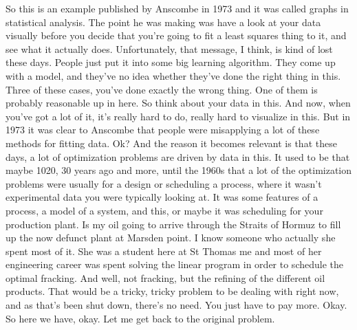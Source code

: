 \documentclass[11pt,a4paper]{article}
\begin{document}
So this is an example published by Anscombe in 1973 and it was called graphs in statistical analysis. The point he was making was have a look at your data visually before you decide that you're going to fit a least squares thing to it, and see what it actually does. Unfortunately, that message, I think, is kind of lost these days. People just put it into some big learning algorithm. They come up with a model, and they've no idea whether they've done the right thing in this. Three of these cases, you've done exactly the wrong thing. One of them is probably reasonable up in here. So think about your data in this. And now, when you've got a lot of it, it's really hard to do, really hard to visualize in this. But in 1973 it was clear to Anscombe that people were misapplying a lot of these methods for fitting data. Ok? And the reason it becomes relevant is that these days, a lot of optimization problems are driven by data in this. It used to be that maybe 1020, 30 years ago and more, until the 1960s that a lot of the optimization problems were usually for a design or scheduling a process, where it wasn't experimental data you were typically looking at. It was some features of a process, a model of a system, and this, or maybe it was scheduling for your production plant. Is my oil going to arrive through the Straits of Hormuz to fill up the now defunct plant at Marsden point. I know someone who actually she spent most of it. She was a student here at St Thomas me and most of her engineering career was spent solving the linear program in order to schedule the optimal fracking. And well, not fracking, but the refining of the different oil products. That would be a tricky, tricky problem to be dealing with right now, and as that's been shut down, there's no need. You just have to pay more. Okay. So here we have, okay. Let me get back to the original problem.
\end{document}
